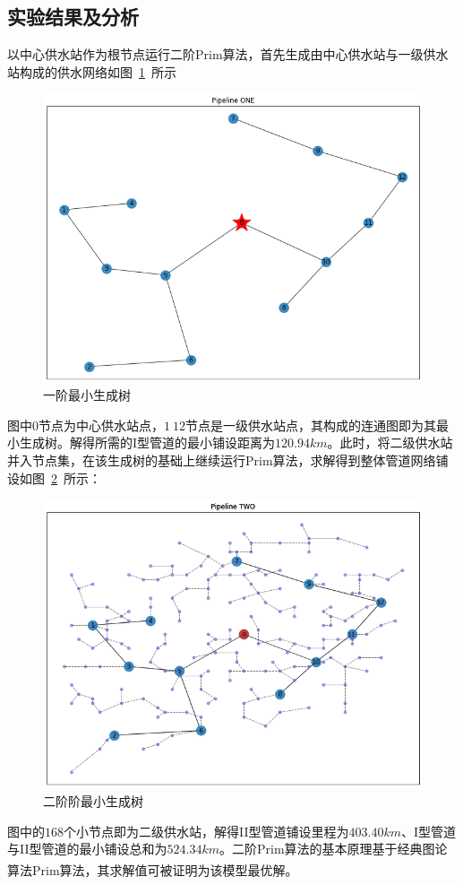 \documentclass{whutmod}
\newcommand{\upcite}[1]{\textsuperscript{\cite{#1}}}
\begin{document}
        \subsection{实验结果及分析}
       以中心供水站作为根节点运行二阶Prim算法，首先生成由中心供水站与一级供水站构成的供水网络如图~\ref{sdfb}~所示
       	\begin{figure}[H]
       	\centering
       	\includegraphics[width=\textwidth]{figures/444.png}
       	\caption{一阶最小生成树}\label{sdfb}
       \end{figure}
       图中$0$节点为中心供水站点，$1~12$节点是一级供水站点，其构成的连通图即为其最小生成树。解得所需的I型管道的最小铺设距离为$120.94km$。此时，将二级供水站并入节点集，在该生成树的基础上继续运行Prim算法，求解得到整体管道网络铺设如图~\ref{sgfhd}~所示：
       	\begin{figure}[H]
       	\centering
       	\includegraphics[width=\textwidth]{figures/222.png}
       	\caption{二阶阶最小生成树}\label{sgfhd}
       \end{figure}
     图中的$168$个小节点即为二级供水站，解得II型管道铺设里程为$403.40km$、I型管道与II型管道的最小铺设总和为$524.34km$。二阶Prim算法的基本原理基于经典图论算法Prim算法，其求解值可被证明为该模型最优解\upcite{1,2}。
\end{document}
